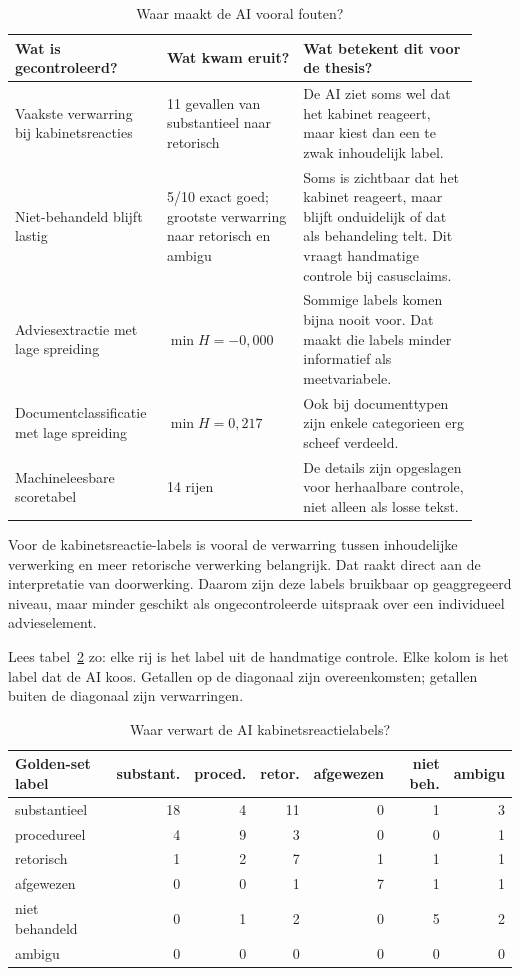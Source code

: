 \begin{table}[htbp]
\centering
\small
\caption{Waar maakt de AI vooral fouten?}
\label{tab:dv2-foutpatronen}
\begin{tabular}{p{0.28\linewidth}p{0.28\linewidth}p{0.36\linewidth}}
\hline
Wat is gecontroleerd? & Wat kwam eruit? & Wat betekent dit voor de thesis? \\
\hline
Vaakste verwarring bij kabinetsreacties & 11 gevallen van substantieel naar retorisch & De AI ziet soms wel dat het kabinet reageert, maar kiest dan een te zwak inhoudelijk label. \\
Niet-behandeld blijft lastig & 5/10 exact goed; grootste verwarring naar retorisch en ambigu & Soms is zichtbaar dat het kabinet reageert, maar blijft onduidelijk of dat als behandeling telt. Dit vraagt handmatige controle bij casusclaims. \\
Adviesextractie met lage spreiding & $\min H = -0{,}000$ & Sommige labels komen bijna nooit voor. Dat maakt die labels minder informatief als meetvariabele. \\
Documentclassificatie met lage spreiding & $\min H = 0{,}217$ & Ook bij documenttypen zijn enkele categorieen erg scheef verdeeld. \\
Machineleesbare scoretabel & 14 rijen & De details zijn opgeslagen voor herhaalbare controle, niet alleen als losse tekst. \\
\hline
\end{tabular}
\end{table}

Voor de kabinetsreactie-labels is vooral de verwarring tussen inhoudelijke verwerking en meer retorische verwerking belangrijk. Dat raakt direct aan de interpretatie van doorwerking. Daarom zijn deze labels bruikbaar op geaggregeerd niveau, maar minder geschikt als ongecontroleerde uitspraak over een individueel advieselement.

Lees tabel~\ref{tab:dv2-confusion-matrix-kabinetsreactie} zo: elke rij is het label uit de handmatige controle. Elke kolom is het label dat de AI koos. Getallen op de diagonaal zijn overeenkomsten; getallen buiten de diagonaal zijn verwarringen.

\begin{table}[htbp]
\centering
\scriptsize
\caption{Waar verwart de AI kabinetsreactielabels?}
\label{tab:dv2-confusion-matrix-kabinetsreactie}
\begin{tabular}{lrrrrrr}
\hline
Golden-set label & substant. & proced. & retor. & afgewezen & niet beh. & ambigu \\
\hline
substantieel & 18 & 4 & 11 & 0 & 1 & 3 \\
procedureel & 4 & 9 & 3 & 0 & 0 & 1 \\
retorisch & 1 & 2 & 7 & 1 & 1 & 1 \\
afgewezen & 0 & 0 & 1 & 7 & 1 & 1 \\
niet behandeld & 0 & 1 & 2 & 0 & 5 & 2 \\
ambigu & 0 & 0 & 0 & 0 & 0 & 0 \\
\hline
\end{tabular}
\end{table}

